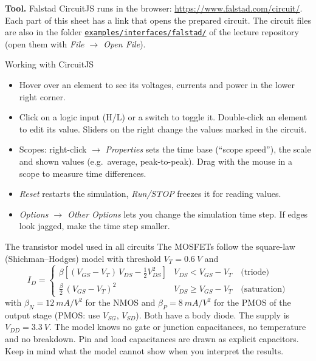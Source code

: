 \documentclass[a4paper,11pt]{article}
\begin{document}
\textbf{Tool.} Falstad CircuitJS runs in the browser: \url{https://www.falstad.com/circuit/}. Each part of this
sheet has a link that opens the prepared circuit. The circuit files are also in the folder
\href{https://github.com/mopfeil/EmbeddedComputing/tree/main/examples/interfaces/falstad}{\texttt{examples/interfaces/falstad/}}
of the lecture repository (open them with \emph{File $\rightarrow$ Open File}).

\begin{modelbox}{Working with CircuitJS}
\begin{itemize}[leftmargin=*]
  \item Hover over an element to see its voltages, currents and power in the lower right corner.
  \item Click on a logic input (\textsf{H}/\textsf{L}) or a switch to toggle it. Double-click an element to edit
        its value. Sliders on the right change the values marked in the circuit.
  \item Scopes: right-click $\rightarrow$ \emph{Properties} sets the time base (``scope speed''), the scale and
        shown values (e.g.\ average, peak-to-peak). Drag with the mouse in a scope to measure time differences.
  \item \emph{Reset} restarts the simulation, \emph{Run/STOP} freezes it for reading values.
  \item \emph{Options $\rightarrow$ Other Options} lets you change the simulation time step. If edges look
        jagged, make the time step smaller.
\end{itemize}
\end{modelbox}

\begin{modelbox}{The transistor model used in all circuits}
The MOSFETs follow the square-law (Shichman--Hodges) model with threshold $V_T=\SI{0.6}{V}$ and
\[
  I_D=\begin{cases}
     \beta\left[(V_{GS}-V_T)\,V_{DS}-\tfrac12 V_{DS}^2\right] & V_{DS} < V_{GS}-V_T \quad\text{(triode)}\\[1mm]
     \tfrac{\beta}{2}\,(V_{GS}-V_T)^2 & V_{DS} \ge V_{GS}-V_T \quad\text{(saturation)}
  \end{cases}
\]
with $\beta_N=\SI{12}{mA/V^2}$ for the NMOS and $\beta_P=\SI{8}{mA/V^2}$ for the PMOS of the output stage (PMOS:
use $V_{SG}$, $V_{SD}$). Both have a body diode. The supply is $V_{DD}=\SI{3.3}{V}$.
The model knows no gate or junction capacitances, no temperature and no breakdown. Pin and load capacitances are
drawn as explicit capacitors. Keep in mind what the model cannot show when you interpret the results.
\end{modelbox}
\end{document}
